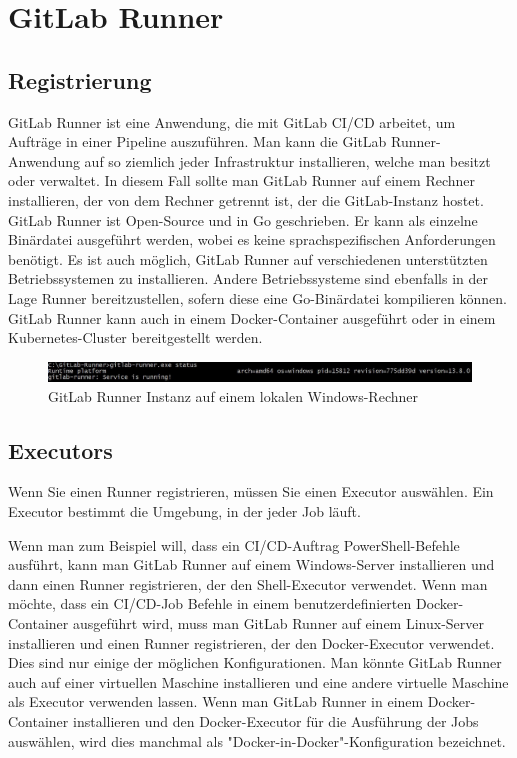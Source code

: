 \section{GitLab Runner} \label{sec:lblGitLabRunner}
\subsection{Registrierung}

GitLab Runner ist eine Anwendung, die mit GitLab CI/CD arbeitet, um Aufträge in einer Pipeline auszuführen.
Man kann die GitLab Runner-Anwendung auf so ziemlich jeder Infrastruktur installieren, welche man besitzt oder verwaltet. In diesem Fall sollte man GitLab Runner auf einem Rechner installieren, der von dem Rechner getrennt ist, der die GitLab-Instanz hostet. GitLab Runner ist Open-Source und in Go geschrieben. Er kann als einzelne Binärdatei ausgeführt werden, wobei es keine sprachspezifischen Anforderungen benötigt.
Es ist auch möglich, GitLab Runner auf verschiedenen unterstützten Betriebssystemen zu installieren. Andere Betriebssysteme sind ebenfalls in der Lage Runner bereitzustellen, sofern diese eine Go-Binärdatei kompilieren können.
GitLab Runner kann auch in einem Docker-Container ausgeführt oder in einem Kubernetes-Cluster bereitgestellt werden.\autocite{gitlabRunner}

\begin{figure}[H]
	\centerline{
		\includegraphics[width=1\textwidth, frame]{./grafiken/gitlab_runner_status.JPG}
	}
	\vskip0pt
	\caption{GitLab Runner Instanz auf einem lokalen Windows-Rechner}
\end{figure}

\subsection{Executors} \label{sssec:lblExecutor}

Wenn Sie einen Runner registrieren, müssen Sie einen Executor auswählen. Ein Executor bestimmt die Umgebung, in der jeder Job läuft.\autocite{gitlabRunner}

Wenn man zum Beispiel will, dass ein CI/CD-Auftrag PowerShell-Befehle ausführt, kann man GitLab Runner auf einem Windows-Server installieren und dann einen Runner registrieren, der den Shell-Executor verwendet.
Wenn man möchte, dass ein CI/CD-Job Befehle in einem benutzerdefinierten Docker-Container ausgeführt wird, muss man GitLab Runner auf einem Linux-Server installieren und einen Runner registrieren, der den Docker-Executor verwendet.
Dies sind nur einige der möglichen Konfigurationen. Man könnte GitLab Runner auch auf einer virtuellen Maschine installieren und eine andere virtuelle Maschine als Executor verwenden lassen.
Wenn man GitLab Runner in einem Docker-Container installieren und den Docker-Executor für die Ausführung der Jobs auswählen, wird dies manchmal als "Docker-in-Docker"-Konfiguration bezeichnet.\autocite{gitlabRunner}

